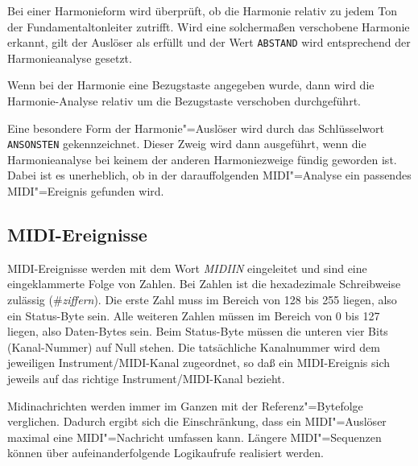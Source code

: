 Bei einer Harmonieform wird überprüft,
ob die Harmonie relativ zu jedem
Ton der Fundamentaltonleiter zutrifft. Wird eine solchermaßen
verschobene Harmonie erkannt, gilt der Auslöser als erfüllt
und der Wert \texttt{ABSTAND} wird entsprechend der Harmonieanalyse gesetzt.

Wenn bei der Harmonie eine Bezugstaste angegeben wurde, dann wird
die Harmonie-Analyse relativ um die Bezugstaste verschoben durchgeführt.

Eine besondere Form der Harmonie"=Auslöser wird durch das
Schlüsselwort \texttt{ANSONSTEN} gekennzeichnet. Dieser Zweig wird
dann ausgeführt, wenn die Harmonieanalyse bei keinem der anderen
Harmoniezweige fündig geworden ist. Dabei ist es unerheblich, ob in
der darauffolgenden MIDI"=Analyse ein passendes MIDI"=Ereignis
gefunden wird.

    

\subsection{MIDI-Ereignisse}\label{sec:midi-ereignisse}
MIDI-Ereignisse werden mit dem Wort \emph{MIDIIN}
eingeleitet und
sind eine eingeklammerte Folge von Zahlen. Bei Zahlen ist die hexadezimale
Schreibweise zulässig (\#\emph{ziffern}).\index{\#}
Die erste Zahl muss im Bereich von
128 bis 255 liegen, also ein Status-Byte sein. Alle weiteren Zahlen
müssen im Bereich von 0 bis 127 liegen, also Daten-Bytes sein.
Beim Status-Byte müssen die unteren vier Bits (Kanal-Nummer) auf Null stehen.
Die tatsächliche Kanalnummer wird dem jeweiligen
Instrument/MIDI-Kanal zugeordnet,
so daß ein MIDI-Ereignis sich jeweils auf das richtige
Instrument/MIDI-Kanal bezieht.
\iffalse
Die Status-Bytes\index{Status-Byte}
 \emph{Note-On\index{Note-On} (\#90)}, \emph{Note-Off\index{Note-Off}
  (\#80)} und
\emph{System-Byte\index{System-Byte}
 (\#F0 - \#FF)} werden nicht in die MIDI-Analyse
einbezogen.
\fi

Midinachrichten werden immer im Ganzen mit der Referenz"=Bytefolge
verglichen. Dadurch ergibt sich die Einschränkung, dass ein
MIDI"=Auslöser maximal eine MIDI"=Nachricht umfassen kann. Längere
MIDI"=Sequenzen können über aufeinanderfolgende Logikaufrufe
realisiert werden.

    

